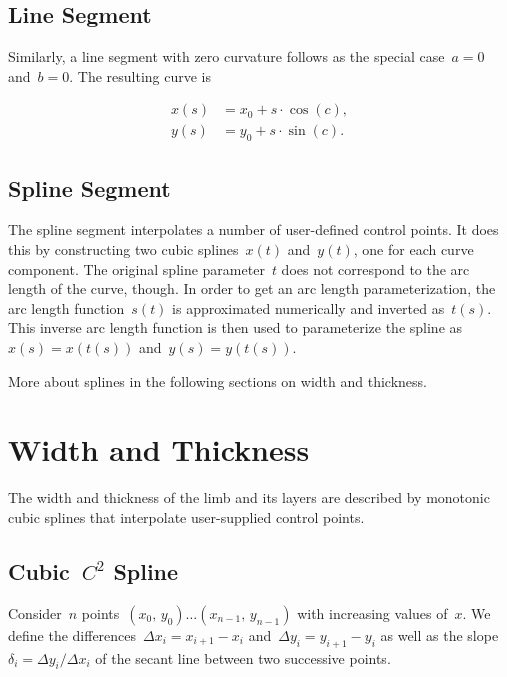 \subsection{Line Segment}

Similarly, a line segment with zero curvature follows as the special case~$a = 0$ and~$b = 0$.
The resulting curve is

\begin{align}
x(s) &= x_0 + s\cdot\cos(c), \\
y(s) &= y_0 + s\cdot\sin(c).
\end{align}

\subsection{Spline Segment}

The spline segment interpolates a number of user-defined control points.
It does this by constructing two cubic splines~$x(t)$ and~$y(t)$, one for each curve component.
The original spline parameter~$t$ does not correspond to the arc length of the curve, though.
In order to get an arc length parameterization, the arc length function~$s(t)$ is approximated numerically and inverted as~$t(s)$.
This inverse arc length function is then used to parameterize the spline as~$x(s) = x(t(s))$ and~$y(s) = y(t(s))$.

More about splines in the following sections on width and thickness.

\section{Width and Thickness}

The width and thickness of the limb and its layers are described by monotonic cubic splines that interpolate user-supplied control points.

\subsection{Cubic~$C^2$ Spline}

Consider~$n$ points~$(x_{0},\,y_{0}) \ldots (x_{n-1},\,y_{n-1})$ with increasing values of~$x$.
We define the differences~$\Delta x_{i} = x_{i+1} - x_{i}$ and~$\Delta y_{i} = y_{i+1} - y_{i}$ as well as the slope~$\delta_{i} = \Delta y_{i} / \Delta x_{i}$ of the secant line between two successive points.

